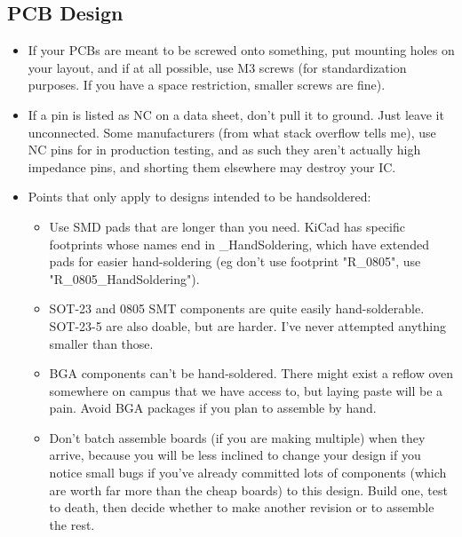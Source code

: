 \documentclass{article}
\begin{document}
\subsection{PCB Design}
\begin{itemize}
\item If your PCBs are meant to be screwed onto something, put mounting holes on your layout, and if at all possible, use M3 screws (for standardization purposes. If you have a space restriction, smaller screws are fine).
\item If a pin is listed as NC on a data sheet, don't pull it to ground. Just leave it unconnected. Some manufacturers (from what stack overflow tells me), use NC pins for in production testing, and as such they aren't actually high impedance pins, and shorting them elsewhere may destroy your IC.

\item Points that only apply to designs intended to be handsoldered:
\begin{itemize}
\item Use SMD pads that are longer than you need. KiCad has specific footprints whose names end in \_HandSoldering, which have extended pads for easier hand-soldering (eg don't use footprint "R\_0805", use "R\_0805\_HandSoldering").
\item SOT-23 and 0805 SMT components are quite easily hand-solderable. SOT-23-5 are also doable, but are harder. I've never attempted anything smaller than those.
\item BGA components can't be hand-soldered. There might exist a reflow oven somewhere on campus that we have access to, but laying paste will be a pain. Avoid BGA packages if you plan to assemble by hand.
\item Don't batch assemble boards (if you are making multiple) when they arrive, because you will be less inclined to change your design if you notice small bugs if you've already committed lots of components (which are worth far more than the cheap boards) to this design. Build one, test to death, then decide whether to make another revision or to assemble the rest.
\end{itemize}
\end{itemize}

\end{document}
